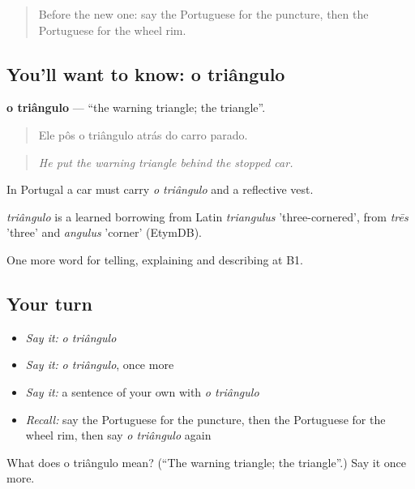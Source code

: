 \label{lesson:PT-C405-triangulo}



\begin{quote}
Before the new one: say the Portuguese for the puncture, then the Portuguese for the wheel rim.
\end{quote}

\subsection*{You'll want to know: o triângulo}
\textbf{o triângulo} — \textquotedblleft{}the warning triangle; the triangle\textquotedblright{}.

\begin{quote}
Ele pôs o triângulo atrás do carro parado.
\end{quote}

\begin{quote}
\emph{He put the warning triangle behind the stopped car.}
\end{quote}

In Portugal a car must carry \emph{o triângulo} and a reflective vest.

\begin{cousinweb}
\emph{triângulo} is a learned borrowing from Latin \emph{triangulus} 'three-cornered', from \emph{trēs} 'three' and \emph{angulus} 'corner' (EtymDB).
\end{cousinweb}

\begin{grammarlens}[title={What you've built}]
One more word for telling, explaining and describing at B1.
\end{grammarlens}

\subsection*{Your turn}
\begin{itemize}
\raggedright
  \item \emph{Say it:} \emph{o triângulo}
  \item \emph{Say it:} \emph{o triângulo}, once more
  \item \emph{Say it:} a sentence of your own with \emph{o triângulo}
  \item \emph{Recall:} say the Portuguese for the puncture, then the Portuguese for the wheel rim, then say \emph{o triângulo} again
\end{itemize}

\begin{tcolorbox}[breakable,colback=teal!4,colframe=teal!35!black,title={Before you move on}]
What does o triângulo mean? (\textquotedblleft{}The warning triangle; the triangle\textquotedblright{}.) Say it once more.
\end{tcolorbox}
